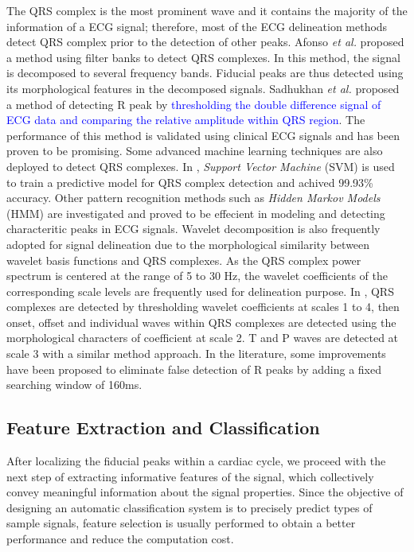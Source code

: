 The QRS complex is the most prominent wave and it contains the majority of the information of a ECG signal; therefore, most of the ECG delineation methods detect QRS complex prior to the detection of other peaks. Afonso \textit{et al.} proposed a method using filter banks to detect QRS complexes\cite{afonso1999ecg}. In this method, the signal is decomposed to several frequency bands. Fiducial peaks are thus detected using its morphological features in the decomposed signals. Sadhukhan \textit{et al.} proposed a method of detecting R peak by \textcolor{blue}{thresholding the double difference signal of ECG data and comparing the relative amplitude within QRS region\cite{sadhukhan2012r}}. The performance of this method is validated using clinical ECG signals and has been proven to be promising. Some advanced machine learning techniques are also deployed to detect QRS complexes. In \cite{mehta2008svm}, \textit{Support Vector Machine} (SVM) is used to train a predictive model for QRS complex detection and achived 99.93\% accuracy. Other pattern recognition methods such as \textit{Hidden Markov Models} (HMM) are investigated and proved to be effecient in modeling and detecting characteritic peaks in ECG signals\cite{andreao2006ecg}. Wavelet decomposition is also frequently adopted for signal delineation due to the morphological similarity between wavelet basis functions and QRS complexes. As the QRS complex power spectrum is centered at the range of 5 to 30 Hz, the wavelet coefficients of the corresponding scale levels are frequently used for delineation purpose. In \cite{martinez2004wavelet}, QRS complexes are detected by thresholding wavelet coefficients at scales 1 to 4, then onset, offset and individual waves within QRS complexes are detected using the morphological characters of coefficient at scale 2. T and P waves are detected at scale 3 with a similar method approach. In the literature, some improvements have been proposed to eliminate false detection of R peaks by adding a fixed searching window of 160ms\cite{banerjee2012delineation}. 

\subsection{Feature Extraction and Classification}

After localizing the fiducial peaks within a cardiac cycle, we proceed with the next step of extracting informative features of the signal, which collectively convey meaningful information about the signal properties. %
Since the objective of designing an automatic classification system is to precisely predict types of sample signals, feature selection is usually performed to obtain a better performance and reduce the computation cost\cite{lagerholm2000clustering, prasad2003classification, autofs, ceylan2009novel, osowski2004support}. 

